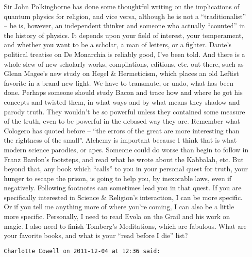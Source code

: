 \begin{footnotesize}
\begin{sffamily}
Sir John Polkinghorne has done some thoughtful writing on the implications of quantum physics for religion, and vice versa, although he is not a ``traditionalist'' – he is, however, an independent thinker and someone who actually ``counted'' in the history of physics. It depends upon your field of interest, your temperament, and whether you want to be a scholar, a man of letters, or a fighter. Dante's political treatise on De Monarchia is reliably good, I've been told. And there is a whole slew of new scholarly works, compilations, editions, etc. out there, such as Glenn Magee's new study on Hegel \& Hermeticism, which places an old Leftist favorite in a brand new light. We have to transmute, or undo, what has been done. Perhaps someone should study Bacon and trace how and where he got his concepts and twisted them, in what ways and by what means they shadow and parody truth. They wouldn't be so powerful unless they contained some measure of the truth, even to be powerful in the debased way they are. Remember what Cologero has quoted before – ``the errors of the great are more interesting than the rightness of the small''. Alchemy is important because I think that is what modern science parodies, or apes. Someone could do worse than begin to follow in Franz Bardon's footsteps, and read what he wrote about the Kabbalah, etc. But beyond that, any book which ``calls'' to you in your personal quest for truth, your hunger to escape the prison, is going to help you, by inexorable laws, even if negatively. Following footnotes can sometimes lead you in that quest. If you are specifically interested in Science \& Religion's interaction, I can be more specific. Or if you tell me anything more of where you're coming, I can also be a little more specific. Personally, I need to read Evola on the Grail and his work on magic. I also need to finish Tomberg's Meditations, which are fabulous. What are your favorite books, and what is your ``read before I die'' list?


\hfill

\texttt{Charlotte Cowell on 2011-12-04 at 12:36 said: }


\end{sffamily}
\end{footnotesize}
